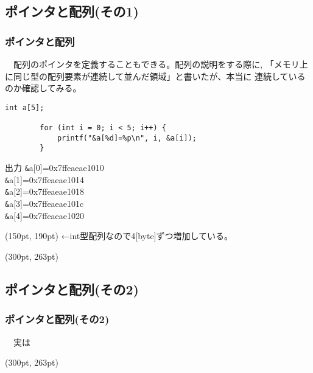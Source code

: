 \subsection{ポインタと配列(その1)}
\begin{frame}[t, fragile, label=71]
    \frametitle{ポインタと配列}
    　配列のポインタを定義することもできる。配列の説明をする際に,
    「メモリ上に同じ型の配列要素が連続して並んだ領域」と書いたが、本当に
    連続しているのか確認してみる。
    \begin{lstlisting}[gobble=8]
        int a[5];
        
        for (int i = 0; i < 5; i++) {
            printf("&a[%d]=%p\n", i, &a[i]);
        }
    \end{lstlisting}
    \begin{block}{出力}
        \verb|&|a[0]=0x7ffeaeae1010\\
        \verb|&|a[1]=0x7ffeaeae1014\\
        \verb|&|a[2]=0x7ffeaeae1018\\
        \verb|&|a[3]=0x7ffeaeae101c\\
        \verb|&|a[4]=0x7ffeaeae1020
    \end{block}
    \begin{textblock*}{0.5\linewidth}(150pt, 190pt)
        ←int型配列なので4[byte]ずつ増加している。
    \end{textblock*}
    \begin{textblock*}{0.3\linewidth}(300pt, 263pt)
        \hyperlink{70}{}
        \space
        \hyperlink{72}{}
    \end{textblock*}
\end{frame}

\subsection{ポインタと配列(その2)}
\begin{frame}[t, fragile, label=72]
    \frametitle{ポインタと配列(その2)}
    　実は
    \begin{textblock*}{0.3\linewidth}(300pt, 263pt)
        \hyperlink{71}{}
        \space
        \hyperlink{70}{}
    \end{textblock*}
\end{frame}
